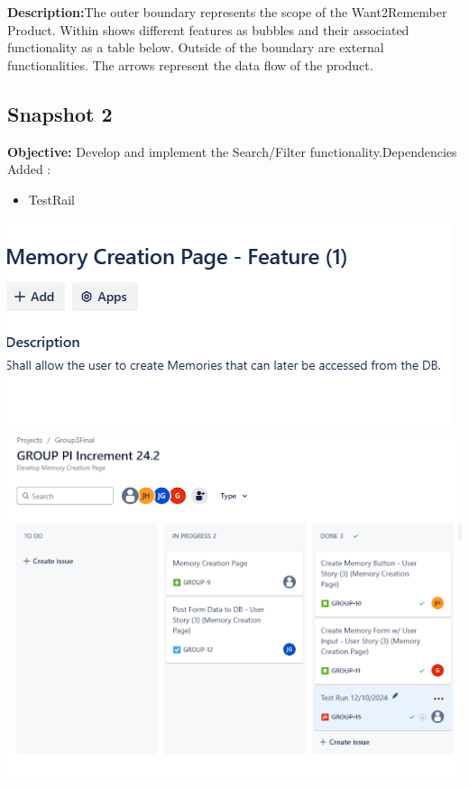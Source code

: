 \documentclass[12pt]{article}
\begin{document}
\textbf{Description:}The outer boundary represents the scope of the Want2Remember Product. Within shows different features as bubbles and their associated functionality as a table below. Outside of the boundary are external functionalities. The arrows represent the data flow of the product.


\subsection{Snapshot 2}
\textbf{Objective:} Develop and implement the Search/Filter functionality.\newline Dependencies Added :
\begin{itemize}
    \item
     TestRail
\end{itemize}
\includegraphics{snapshot2img1.png}
\includegraphics{snapshot2img2.png}
\end{document}
